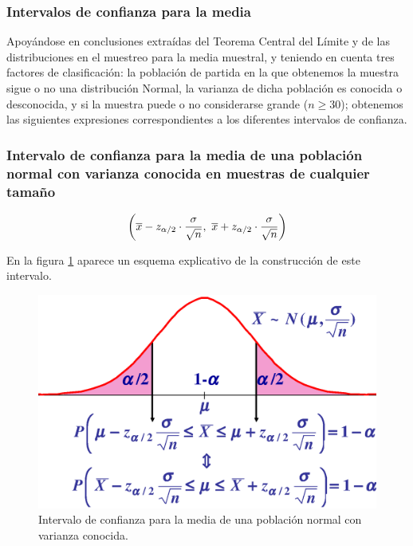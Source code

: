 \documentclass[a4paper]{article}
\begin{document}
\subsubsection*{Intervalos de confianza para la media}

Apoyándose en conclusiones extraídas del Teorema Central
del Límite y de las distribuciones en el muestreo para la media
muestral, y teniendo en cuenta tres factores de clasificación: la
población de partida en la que obtenemos la muestra sigue o no una
distribución Normal, la varianza de dicha población es conocida o
desconocida, y si la muestra puede o no considerarse grande
($n\geq30$); obtenemos las siguientes expresiones correspondientes
a los diferentes intervalos de confianza.

\subsubsection*{Intervalo de confianza para la media de una
población normal con varianza conocida en muestras de
cualquier tamaño}

\[
\left( \overline{x}-z_{\alpha /2}\cdot \dfrac{\sigma }{\sqrt{n}},\ \overline{%
x}+z_{\alpha /2}\cdot \dfrac{\sigma }{\sqrt{n}}\right)
\]

En la figura \ref{g:intervalomedia} aparece un esquema explicativo de la construcción de este intervalo.

\begin{figure}[h!]
\begin{center}
\includegraphics[scale=0.5]{intervalomedia.eps}
\caption{Intervalo de confianza para la media de una población
normal con varianza conocida.} \label{g:intervalomedia}
\end{center}
\end{figure}
\end{document}
